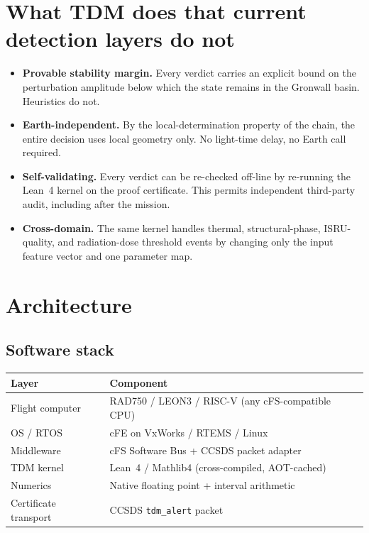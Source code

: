 \documentclass[11pt,a4paper]{article}
\begin{document}
\section{What TDM does that current detection layers do not}

\begin{itemize}
  \item \textbf{Provable stability margin.}  Every verdict carries an
    explicit bound on the perturbation amplitude below which the state
    remains in the Gronwall basin.  Heuristics do not.
  \item \textbf{Earth-independent.}  By the local-determination property of
    the chain, the entire decision uses local geometry only.  No light-time
    delay, no Earth call required.
  \item \textbf{Self-validating.}  Every verdict can be re-checked off-line
    by re-running the Lean~4 kernel on the proof certificate.  This permits
    independent third-party audit, including after the mission.
  \item \textbf{Cross-domain.}  The same kernel handles thermal,
    structural-phase, ISRU-quality, and radiation-dose threshold events
    by changing only the input feature vector and one parameter map.
\end{itemize}

\section{Architecture}

\subsection{Software stack}

\begin{tabular}{ll}
\toprule
\textbf{Layer} & \textbf{Component} \\
\midrule
Flight computer       & RAD750 / LEON3 / RISC-V (any cFS-compatible CPU) \\
OS / RTOS             & cFE on VxWorks / RTEMS / Linux \\
Middleware            & cFS Software Bus + CCSDS packet adapter \\
TDM kernel            & Lean~4 / Mathlib4 (cross-compiled, AOT-cached) \\
Numerics              & Native floating point + interval arithmetic \\
Certificate transport & CCSDS \texttt{tdm\_alert} packet \\
\bottomrule
\end{tabular}
\end{document}

